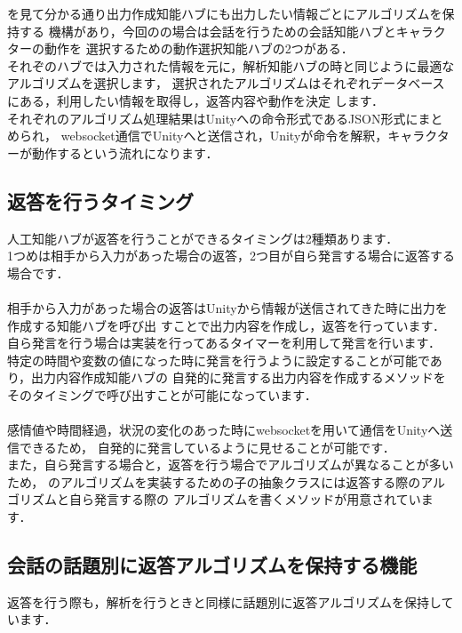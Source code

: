 
を見て分かる通り出力作成知能ハブにも出力したい情報ごとにアルゴリズムを保持する
機構があり，今回のの場合は会話を行うための会話知能ハブとキャラクターの動作を
選択するための動作選択知能ハブの2つがある．\\

それぞのハブでは入力された情報を元に，解析知能ハブの時と同じように最適なアルゴリズムを選択します，
選択されたアルゴリズムはそれぞれデータベースにある，利用したい情報を取得し，返答内容や動作を決定
します．\\

それぞれのアルゴリズム処理結果はUnityへの命令形式であるJSON形式にまとめられ，
websocket通信でUnityへと送信され，Unityが命令を解釈，キャラクターが動作するという流れになります．


\subsection{返答を行うタイミング}
人工知能ハブが返答を行うことができるタイミングは2種類あります．\\
1つめは相手から入力があった場合の返答，2つ目が自ら発言する場合に返答する場合です．\\
\\
相手から入力があった場合の返答はUnityから情報が送信されてきた時に出力を作成する知能ハブを呼び出
すことで出力内容を作成し，返答を行っています．\\

自ら発言を行う場合は実装を行ってあるタイマーを利用して発言を行います．
特定の時間や変数の値になった時に発言を行うように設定することが可能であり，出力内容作成知能ハブの
自発的に発言する出力内容を作成するメソッドをそのタイミングで呼び出すことが可能になっています．\\
\\
感情値や時間経過，状況の変化のあった時にwebsocketを用いて通信をUnityへ送信できるため，
自発的に発言しているように見せることが可能です．\\

また，自ら発言する場合と，返答を行う場合でアルゴリズムが異なることが多いため，
のアルゴリズムを実装するための子の抽象クラスには返答する際のアルゴリズムと自ら発言する際の
アルゴリズムを書くメソッドが用意されています．\\

\subsection{会話の話題別に返答アルゴリズムを保持する機能}
返答を行う際も，解析を行うときと同様に話題別に返答アルゴリズムを保持しています．\\

